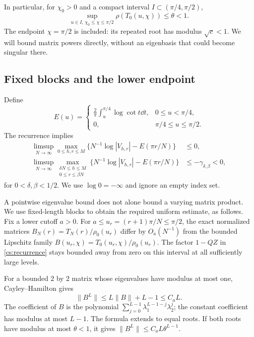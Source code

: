 In particular, for $\chi_0>0$ and a compact interval $I\subset(\pi/4,\pi/2)$,
\begin{equation}\label{cs:strict-radius}
 \sup_{u\in I,\,\chi_0\le\chi\le\pi/2}\rho(T_0(u,\chi))
 \le\theta<1.
\end{equation}
The endpoint $\chi=\pi/2$ is included: its repeated root has modulus $\sqrt c<1$. We will bound matrix powers directly, without an eigenbasis that could become singular there.

\subsection{Fixed blocks and the lower endpoint}
Define
\begin{equation}\label{cs:E}
 E(u)=\begin{cases}\displaystyle\frac2\pi\int_u^{\pi/4}\log\cot t\dd t,
 &0\le u<\pi/4,\\0,&\pi/4\le u\le\pi/2.
 \end{cases}
\end{equation}
The recurrence implies
\begin{align}
 \limsup_{N\to\infty}\max_{0\le h,r\le M}
 \{N^{-1}\log|V_{h,r}|-E(\pi r/N)\}&\le0,\label{cs:global-V}\\
 \limsup_{N\to\infty}
 \max_{\substack{\delta N\le h\le M\\0\le r\le\beta N}}
 \{N^{-1}\log|V_{h,r}|-E(\pi r/N)\}&\le-\gamma_{\delta,\beta}<0,
 \label{cs:strict-V}
\end{align}
for $0<\delta,\beta<1/2$. We use $\log0=-\infty$ and ignore an empty index set.

A pointwise eigenvalue bound does not alone bound a varying matrix product. We use fixed-length blocks to obtain the required uniform estimate, as follows. Fix a lower cutoff $a>0$. For $a\le u_r=(r+1)\pi/N\le\pi/2$, the exact normalized matrices
$B_N(r)=T_N(r)/\rho_0(u_r)$ differ by $O_a(N^{-1})$ from the bounded Lipschitz family $B(u_r,\chi)=T_0(u_r,\chi)/\rho_0(u_r)$. The factor $1-QZ$ in \eqref{cs:recurrence} stays bounded away from zero on this interval at all sufficiently large levels.

For a bounded $2$ by $2$ matrix whose eigenvalues have modulus at most one, Cayley--Hamilton gives
\begin{equation}\label{cs:matrix-power}
 \|B^L\|\le L\|B\|+L-1\le C_a L.
\end{equation}
The coefficient of $B$ is the polynomial
$\sum_{j=0}^{L-1}\lambda_1^{L-1-j}\lambda_2^j$; the constant coefficient has modulus at most $L-1$. The formula extends to equal roots. If both roots have modulus at most $\theta<1$, it gives $\|B^L\|\le C_a L\theta^{L-1}$.

